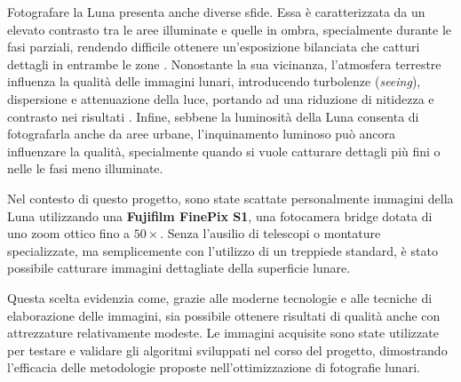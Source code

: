 Fotografare la Luna presenta anche diverse sfide. Essa è caratterizzata da un elevato contrasto tra le aree illuminate e quelle in ombra, specialmente durante le fasi parziali, rendendo difficile ottenere un'esposizione bilanciata che catturi dettagli in entrambe le zone \cite{sheehan_epic_moon}. Nonostante la sua vicinanza, l'atmosfera terrestre influenza la qualità delle immagini lunari, introducendo turbolenze (\textit{seeing}), dispersione e attenuazione della luce, portando ad una riduzione di nitidezza e contrasto nei risultati \cite{sheehan_epic_moon}. Infine, sebbene la luminosità della Luna consenta di fotografarla anche da aree urbane, l'inquinamento luminoso può ancora influenzare la qualità, specialmente quando si vuole catturare dettagli più fini o nelle le fasi meno illuminate.

Nel contesto di questo progetto, sono state scattate personalmente immagini della Luna utilizzando una \textbf{Fujifilm FinePix S1}, una fotocamera bridge dotata di uno zoom ottico fino a $50 \times$. Senza l'ausilio di telescopi o montature specializzate, ma semplicemente con l'utilizzo di un treppiede standard, è stato possibile catturare immagini dettagliate della superficie lunare.

Questa scelta evidenzia come, grazie alle moderne tecnologie e alle tecniche di elaborazione delle immagini, sia possibile ottenere risultati di qualità anche con attrezzature relativamente modeste. Le immagini acquisite sono state utilizzate per testare e validare gli algoritmi sviluppati nel corso del progetto, dimostrando l'efficacia delle metodologie proposte nell'ottimizzazione di fotografie lunari.
\cleardoublepage